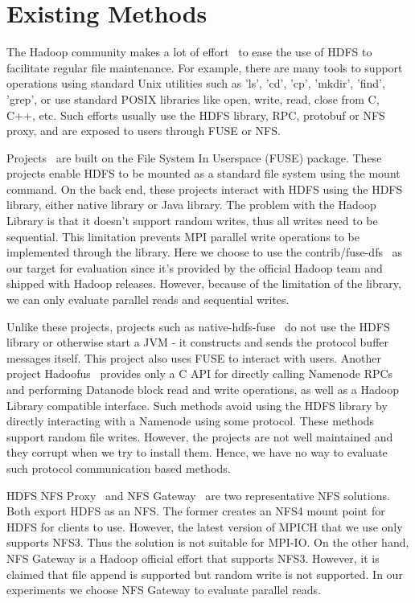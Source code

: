 \section{Existing Methods}
\label{sec:bg}
The Hadoop community makes a lot of effort~\cite{fuse} to ease the use of HDFS to
facilitate regular file maintenance. For example, there are many tools to support
operations using standard Unix
utilities such as 'ls', 'cd', 'cp', 'mkdir', 'find', 'grep', or use standard
POSIX libraries like open, write, read, close from C, C++, etc. Such efforts
usually use the HDFS library, RPC, protobuf or NFS proxy, and are exposed to users
through FUSE or NFS.

Projects~\cite{fuse, hdfs-fuse, fuse-j} are built on the File System In Userspace (FUSE) package. These projects enable
HDFS to be mounted as a standard file system using the mount command. On the
back end, these projects interact with HDFS using the HDFS library, either native
library or Java library. The problem with the Hadoop Library is that it doesn't
support random writes, thus all writes need to be sequential. This limitation
prevents MPI parallel write operations to be implemented through the library.
Here we choose
to use the contrib/fuse-dfs~\cite{fuse} as our target for evaluation since it's
provided by the official Hadoop team and shipped with Hadoop releases. However,
because of the limitation of the library, we can only evaluate parallel reads and
sequential writes.

Unlike
these projects, projects such as native-hdfs-fuse~\cite{native} do not use the
HDFS library or otherwise start a JVM - it constructs and sends the protocol buffer
messages itself. This project also uses FUSE to interact with users. Another
project Hadoofus~\cite{hadoofus} provides only a C
API for directly calling Namenode RPCs and performing Datanode block read and
write operations, as well as a Hadoop Library compatible interface. Such methods
avoid using the HDFS library by directly interacting with a Namenode using some
protocol. These methods support random file writes. However, the projects are
not well maintained and they corrupt when we try to install them. Hence, we have
no way to evaluate such protocol communication based methods.

HDFS NFS Proxy~\cite{proxy} and NFS Gateway~\cite{nfs} are two representative
NFS solutions. Both export HDFS as an NFS. The former creates an NFS4 mount point
for HDFS for clients to use. However, the latest version of MPICH that
we use only supports NFS3. Thus the solution is not suitable for MPI-IO. On the
other hand, NFS Gateway is a Hadoop official effort that supports NFS3. However,
it is claimed that file append is supported but random write is not supported.
In our experiments we choose NFS Gateway to evaluate parallel reads.
